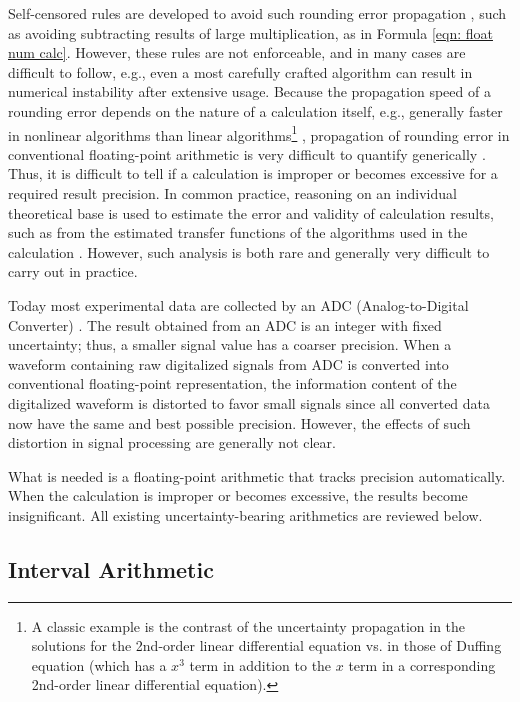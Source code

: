 \documentclass[twoside]{article}
\numberwithin{equation}{section}
\begin{document}
Self-censored rules are developed to avoid such rounding error propagation \cite{Numerical_Recipes}\cite{Precise_Numerical_Methods}, such as avoiding subtracting results of large multiplication, as in Formula \eqref{eqn: float num calc}.  
However, these rules are not enforceable, and in many cases are difficult to follow, e.g., even a most carefully crafted algorithm can result in numerical instability after extensive usage.  
Because the propagation speed of a rounding error depends on the nature of a calculation itself, e.g., generally faster in nonlinear algorithms than linear algorithms\footnote{A classic example is the contrast of the uncertainty propagation in the solutions for the 2nd-order linear differential equation vs. in those of Duffing equation (which has a $x^3$ term in addition to the $x$ term in a corresponding 2nd-order linear differential equation).} \cite{Chaotic_Dynamics}, propagation of rounding error in conventional floating-point arithmetic is very difficult to quantify generically \cite{Stochastic_Arithmetic}.  
Thus, it is difficult to tell if a calculation is improper or becomes excessive for a required result precision.  
In common practice, reasoning on an individual theoretical base is used to estimate the error and validity of calculation results, such as from the estimated transfer functions of the algorithms used in the calculation \cite{Numerical_Recipes}\cite{Error_Analysi_Digital_Filters}\cite{Floating-point_Digital_Filters}.  
However, such analysis is both rare and generally very difficult to carry out in practice.  

Today most experimental data are collected by an ADC (Analog-to-Digital Converter) \cite{Electronics}.  
The result obtained from an ADC is an integer with fixed uncertainty; thus, a smaller signal value has a coarser precision.  
When a waveform containing raw digitalized signals from ADC is converted into conventional floating-point representation, the information content of the digitalized waveform is distorted to favor small signals since all converted data now have the same and best possible precision.  
However, the effects of such distortion in signal processing are generally not clear.

What is needed is a floating-point arithmetic that tracks precision automatically.  
When the calculation is improper or becomes excessive, the results become insignificant.  
All existing uncertainty-bearing arithmetics are reviewed below. 


\subsection{Interval Arithmetic}
\end{document}
